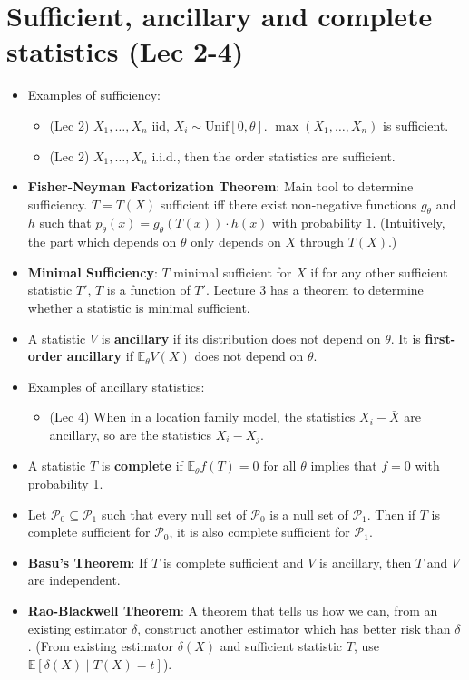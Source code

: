 \documentclass[twoside]{article}
\newcommand\bbE{\mathbb{E}}
\newcommand\calP{\mathcal{P}}
\newcommand\dlt{\delta}
\def\t{\theta}
\begin{document}
\section*{Sufficient, ancillary and complete statistics (Lec 2-4)}
\begin{itemize}
\item Examples of sufficiency:
\begin{itemize}
\item (Lec 2) $X_1, \dots, X_n$ iid, $X_i \sim \text{Unif}[0, \t]$. $\max (X_1, \dots, X_n)$ is sufficient.
\item (Lec 2) $X_1, \dots, X_n$ i.i.d., then the order statistics are sufficient.
\end{itemize}

\item \textbf{Fisher-Neyman Factorization Theorem}: Main tool to determine sufficiency. $T = T(X)$ sufficient iff there exist non-negative functions $g_\t$ and $h$ such that $p_\t(x) = g_\t(T(x)) \cdot h(x)$ with probability 1. (Intuitively, the part which depends on $\t$ only depends on $X$ through $T(X)$.)

\item \textbf{Minimal Sufficiency}: $T$ minimal sufficient for $X$ if for any other sufficient statistic $T'$, $T$ is a function of $T'$. Lecture 3 has a theorem to determine whether a statistic is minimal sufficient.

\item A statistic $V$ is \textbf{ancillary} if its distribution does not depend on $\t$. It is \textbf{first-order ancillary} if $\bbE_\t V(X)$ does not depend on $\t$.

\item Examples of ancillary statistics:
\begin{itemize}
\item (Lec 4) When in a location family model, the statistics $X_i - \bar{X}$ are ancillary, so are the statistics $X_i - X_j$.
\end{itemize}

\item A statistic $T$ is \textbf{complete} if $\bbE_\t f(T) = 0$ for all $\t$ implies that $f = 0$ with probability 1.

\item Let $\calP_0 \subseteq \calP_1$ such that every null set of $\calP_0$ is a null set of $\calP_1$. Then if $T$ is complete sufficient for $\calP_0$, it is also complete sufficient for $\calP_1$.

\item \textbf{Basu's Theorem}: If $T$ is complete sufficient and $V$ is ancillary, then $T$ and $V$ are independent.

\item \textbf{Rao-Blackwell Theorem}: A theorem that tells us how we can, from an existing estimator $\dlt$, construct another estimator which has better risk than $\dlt$. (From existing estimator $\dlt(X)$ and sufficient statistic $T$, use $\bbE [\dlt(X) \mid T(X) = t]$).

\end{itemize}
\end{document}

